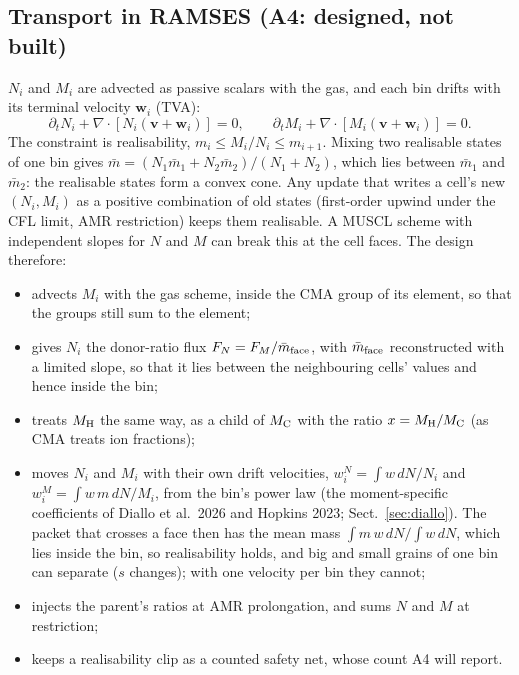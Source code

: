\documentclass[11pt,a4paper]{article}
\newcommand{\MH}{M_{\rm H}}
\newcommand{\MC}{M_{\rm C}}
\begin{document}
\subsection{Transport in RAMSES (A4: designed, not built)}
$N_i$ and $M_i$ are advected as passive scalars with the gas, and each bin drifts with its terminal velocity $\mathbf
w_i$ (TVA):
\begin{equation}
\partial_t N_i + \nabla\!\cdot[N_i(\mathbf v + \mathbf w_i)] = 0,\qquad
\partial_t M_i + \nabla\!\cdot[M_i(\mathbf v + \mathbf w_i)] = 0 .
\end{equation}
The constraint is realisability, $m_i \le M_i/N_i \le m_{i+1}$. Mixing two realisable states of one bin gives
$\bar m = (N_1\bar m_1 + N_2\bar m_2)/(N_1+N_2)$, which lies between $\bar m_1$ and $\bar m_2$: the realisable states
form a convex cone. Any update that writes a cell's new $(N_i, M_i)$ as a positive combination of old states
(first-order upwind under the CFL limit, AMR restriction) keeps them realisable. A MUSCL scheme with independent slopes
for $N$ and $M$ can break this at the cell faces. The design therefore:
\begin{itemize}
\item advects $M_i$ with the gas scheme, inside the CMA group of its element, so that the groups still sum to the
  element;
\item gives $N_i$ the donor-ratio flux $F_N = F_M/\bar m_{\rm face}$, with $\bar m_{\rm face}$ reconstructed with a
  limited slope, so that it lies between the neighbouring cells' values and hence inside the bin;
\item treats $\MH$ the same way, as a child of $\MC$ with the ratio $x = \MH/\MC$ (as CMA treats ion fractions);
\item moves $N_i$ and $M_i$ with their own drift velocities, $w^N_i = \int w\,dN/N_i$ and $w^M_i = \int w\,m\,dN/M_i$,
  from the bin's power law (the moment-specific coefficients of Diallo et al.\ 2026 and Hopkins 2023;
  Sect.~\ref{sec:diallo}). The packet that crosses a face then has the mean mass $\int m\,w\,dN/\int w\,dN$, which
  lies inside the bin, so realisability holds, and big and small grains of one bin can separate ($s$ changes); with one
  velocity per bin they cannot;
\item injects the parent's ratios at AMR prolongation, and sums $N$ and $M$ at restriction;
\item keeps a realisability clip as a counted safety net, whose count A4 will report.
\end{itemize}
\end{document}

